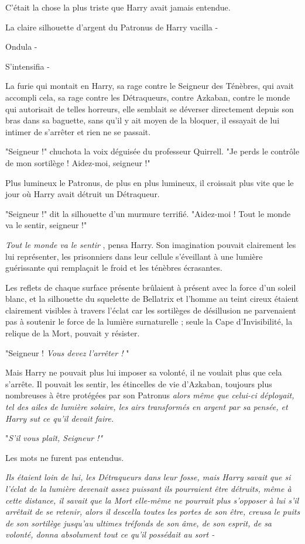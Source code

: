 C'était la chose la plus triste que Harry avait jamais entendue.

La claire silhouette d'argent du Patronus de Harry vacilla -

Ondula -

S'intensifia -

La furie qui montait en Harry, sa rage contre le Seigneur des Ténèbres, qui avait accompli cela, sa rage contre les Détraqueurs, contre Azkaban, contre le monde qui autorisait de telles horreurs, elle semblait se déverser directement depuis son bras dans sa baguette, sans qu'il y ait moyen de la bloquer, il essayait de lui intimer de s'arrêter et rien ne se passait.

"Seigneur !" chuchota la voix déguisée du professeur Quirrell. "Je perds le contrôle de mon sortilège ! Aidez-moi, seigneur !"

Plus lumineux le Patronus, de plus en plus lumineux, il croissait plus vite que le jour où Harry avait détruit un Détraqueur.

"Seigneur !" dit la silhouette d'un murmure terrifié. "Aidez-moi ! Tout le monde va le sentir, seigneur !"

\emph{Tout le monde va le sentir} , pensa Harry. Son imagination pouvait clairement les lui représenter, les prisonniers dans leur cellule s'éveillant à une lumière guérissante qui remplaçait le froid et les ténèbres écrasantes.

Les reflets de chaque surface présente brûlaient à présent avec la force d'un soleil blanc, et la silhouette du squelette de Bellatrix et l'homme au teint cireux étaient clairement visibles à travers l'éclat car les sortilèges de désillusion ne parvenaient pas à soutenir le force de la lumière surnaturelle ; seule la Cape d'Invisibilité, la relique de la Mort, pouvait y résister.

"Seigneur ! \emph{Vous devez l'arrêter !} "

Mais Harry ne pouvait plus lui imposer sa volonté, il ne voulait plus que cela s'arrête. Il pouvait les sentir, les étincelles de vie d'Azkaban, toujours plus nombreuses à être protégées par son Patronus \emph{alors même que celui-ci déployait, tel des ailes de lumière solaire, les airs transformés en argent par sa pensée, et Harry sut ce qu'il devait faire.} 

"\emph{S'il vous plaît, Seigneur !"} 

Les mots ne furent pas entendus.

\emph{Ils étaient loin de lui, les Détraqueurs dans leur fosse, mais Harry savait que si l'éclat de la lumière devenait assez puissant ils pourraient être détruits, même à cette distance, il savait que la Mort elle-même ne pourrait plus s'opposer à lui s'il arrêtait de se retenir, alors il descella toutes les portes de son être, creusa le puits de son sortilège jusqu'au ultimes tréfonds de son âme, de son esprit, de sa volonté, donna absolument tout ce qu'il possédait au sort -} 

